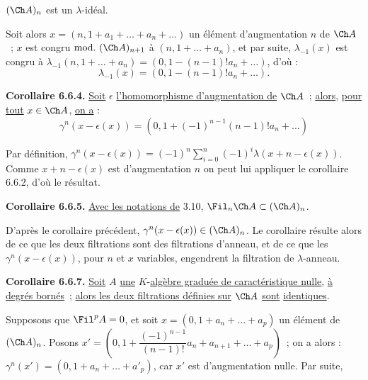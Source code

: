 
\((\Ch A)_n\) est un \(\lambda\)-idéal.

Soit alors \(x=(n,1+a_1+\ldots+a_n+\ldots)\) un élément d'augmentation \(n\) de \(\Ch A\)~; \(x\) est congru \(\mathrm{mod.}\ (\Ch A)_{n+1}\) à \((n,1+\ldots+a_n)\), et par suite, \(\lambda_{-1}(x)\) est congru à \(\lambda_{-1}(n,1+\ldots+a_n)=(0,1-(n-1)!a_n+\ldots)\), d'où :
\[
  \lambda_{-1}(x)=(0,1-(n-1)!a_n+\ldots).
\]

\textbf{Corollaire 6.6.4.} \uline{Soit} \(\epsilon\) \uline{l'homomorphisme d'augmentation de} \(\Ch A\)~; \uline{alors}, \uline{pour tout} \(x\in\Ch A\), \uline{on a} :
\[
  \gamma^n(x-\epsilon(x))
  =
  (0,1+(-1)^{n-1}(n-1)!a_n+\ldots)
\]

Par définition, \(\gamma^n(x-\epsilon(x))=(-1)^n\sum_{i=0}^n(-1)^i\lambda(x+n-\epsilon(x))\). Comme \(x+n-\epsilon(x)\) est d'augmentation \(n\) on peut lui appliquer le corollaire 6.6.2, d'où le résultat.

\textbf{Corollaire 6.6.5.} \uline{Avec les notations de} 3.10, \(\Fil_n\Ch A\subset(\Ch A)_n\).

D'après le corollaire précédent, \(\gamma^n(x-\epsilon(x))\in(\Ch A)_n\). Le corollaire résulte alors de ce que les deux filtrations sont des filtrations d'anneau, et de ce que les \(\gamma^n(x-\epsilon(x))\), pour \(n\) et \(x\) variables, engendrent la filtration de \(\lambda\)-anneau.

\textbf{Corollaire 6.6.7.} \uline{Soit} \(A\) \uline{une} \(K\)-\uline{algèbre graduée de caractéristique nulle}, \uline{à degrés bornés}~; \uline{alors les deux filtrations définies sur} \(\Ch A\) \uline{sont} \uline{identiques}.

Supposons que \(\Fil^pA=0\), et soit \(x=(0,1+a_n+\ldots+a_p)\) un élément de \((\Ch A)_n\). Posons \(x'=\left(0,1+\dfrac{(-1)^{n-1}}{(n-1)!}a_n+a_{n+1}+\ldots+a_p\right)\)~; on a alors :
\(\gamma^n(x')=(0,1+a_n+\ldots+a'_p)\), car \(x'\) est d'augmentation nulle. Par suite, 
